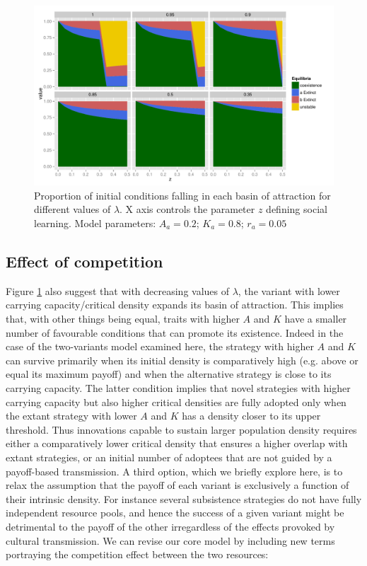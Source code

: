 \documentclass[review,authoryear]{elsarticle}
\begin{document}
\begin{figure}
  \centering
      \includegraphics[width=\textwidth]{./figures/figure6}
  \caption{Proportion of initial conditions falling in each basin of attraction for different values of $\lambda$. X axis controls the parameter $z$ defining social learning. Model parameters: $A_a=0.2$; $K_a=0.8$; $r_a=0.05$}
    \label{fig:percentages}
\end{figure}

\subsection{Effect of competition}

Figure \ref{fig:percentages} also suggest that with decreasing values of $\lambda$, the variant with lower carrying capacity/critical density expands its basin of attraction. This implies that, with other things being equal, traits with higher $A$ and $K$ have a smaller number of favourable conditions that can promote its existence. Indeed in the case of the two-variants model examined here, the strategy with higher $A$ and $K$ can survive primarily when its initial density is comparatively high (e.g. above or equal its maximum payoff) and when the alternative strategy is close to its carrying capacity. The latter condition implies that novel strategies with higher carrying capacity but also higher critical densities are fully adopted only when the extant strategy with lower $A$ and $K$ has a density closer to its upper threshold. Thus innovations capable to sustain larger population density requires either a comparatively lower critical density that ensures a higher overlap with extant strategies, or an initial number of adoptees that are not guided by a payoff-based transmission. A third option, which we briefly explore here, is to relax the assumption that the payoff of each variant is exclusively a function of their intrinsic density. For instance several subsistence strategies do not have fully independent resource pools, and hence the success of a given variant might be detrimental to the payoff of the other irregardless of the effects provoked by cultural transmission. We can revise our core model by including new terms portraying the competition effect between the two resources:  
\end{document}
